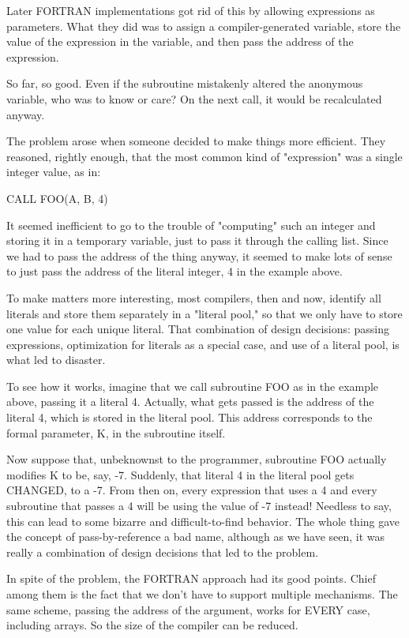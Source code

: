\documentclass[float=false, crop=false]{standalone}
\begin{document}
Later FORTRAN implementations got rid of this by allowing expressions as
parameters. What they did was to assign a compiler-generated variable, store the
value of the expression in the variable, and then pass the address of the
expression.

So far, so good. Even if the subroutine mistakenly altered the anonymous
variable, who was to know or care? On the next call, it would be recalculated
anyway.

The problem arose when someone decided to make things more efficient. They
reasoned, rightly enough, that the most common kind of "expression" was a single
integer value, as in:


     CALL FOO(A, B, 4)


It seemed inefficient to go to the trouble of "computing" such an integer and
storing it in a temporary variable, just to pass it through the calling list.
Since we had to pass the address of the thing anyway, it seemed to make lots of
sense to just pass the address of the literal integer, 4 in the example above.

To make matters more interesting, most compilers, then and now, identify all
literals and store them separately in a "literal pool," so that we only have to
store one value for each unique literal. That combination of design decisions:
passing expressions, optimization for literals as a special case, and use of a
literal pool, is what led to disaster.

To see how it works, imagine that we call subroutine FOO as in the example
above, passing it a literal 4. Actually, what gets passed is the address of the
literal 4, which is stored in the literal pool. This address corresponds to the
formal parameter, K, in the subroutine itself.

Now suppose that, unbeknownst to the programmer, subroutine FOO actually
modifies K to be, say, -7. Suddenly, that literal 4 in the literal pool gets
CHANGED, to a -7. From then on, every expression that uses a 4 and every
subroutine that passes a 4 will be using the value of -7 instead! Needless to
say, this can lead to some bizarre and difficult-to-find behavior. The whole
thing gave the concept of pass-by-reference a bad name, although as we have
seen, it was really a combination of design decisions that led to the problem.

In spite of the problem, the FORTRAN approach had its good points. Chief among
them is the fact that we don't have to support multiple mechanisms. The same
scheme, passing the address of the argument, works for EVERY case, including
arrays. So the size of the compiler can be reduced.
\end{document}

